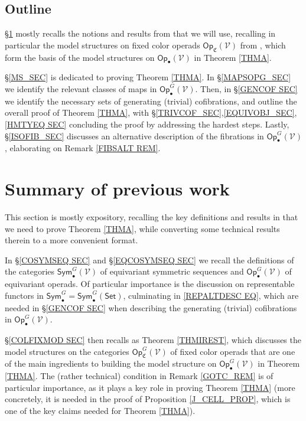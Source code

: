 \documentclass[a4paper,10pt
 ,final
]{article}%
\numberwithin{equation}{section}
\numberwithin{figure}{section}
\theoremstyle{definition} %
\newcommand{\V}{\ensuremath{\mathcal V}}
\newcommand{\1}{\ensuremath{\mathbbm 1}}%
\begin{document}
\subsection{Outline}


\S \ref{SUM SEC} mostly recalls the notions and results from
\cite{BP_FCOP} that we will use,
recalling in particular the model structures
on fixed color operads 
$\mathsf{Op}_{\mathfrak{C}}(\V)$ from
\cite[Thm. \ref{OC-THMI}]{BP_FCOP},
which form the basis of the model structures on
$\mathsf{Op}_{\bullet}(\V)$
in Theorem \ref{THMA}.


\S \ref{MS_SEC} is dedicated to proving 
Theorem \ref{THMA}.
In \S \ref{MAPSOPG_SEC} we identify the relevant classes of maps
in $\mathsf{Op}^G_{\bullet}(\V)$.
Then, in \S \ref{GENCOF SEC} we identify
the necessary sets of generating (trivial) cofibrations,
and outline the overall proof of Theorem \ref{THMA},
with \S \ref{TRIVCOF_SEC},\ref{EQUIVOBJ_SEC},\ref{HMTYEQ SEC}
concluding the proof by addressing the hardest steps.
Lastly, \S \ref{ISOFIB_SEC} discusses an alternative description
of the fibrations in
$\mathsf{Op}^G_{\bullet}(\V)$,
elaborating on 
Remark \ref{FIBSALT REM}.






\section{Summary of previous work}
\label{SUM SEC}


This section is mostly expository, 
recalling the key definitions and results 
in \cite{BP_FCOP} that we need to 
prove Theorem \ref{THMA},
while converting some technical results therein 
to a more convenient format.


In \S \ref{COSYMSEQ SEC} and \S \ref{EQCOSYMSEQ SEC} 
we recall the definitions
of the categories
$\mathsf{Sym}^G_{\bullet}(\V)$
of equivariant symmetric sequences and
$\mathsf{Op}^G_{\bullet}(\V)$
of equivariant operads.
Of particular importance is the discussion on 
representable functors in 
$\mathsf{Sym}^G_{\bullet}
=
\mathsf{Sym}^G_{\bullet}(\mathsf{Set})$,
culminating in \eqref{REPALTDESC EQ},
which are needed in \S \ref{GENCOF SEC}
when describing the generating (trivial) cofibrations
in $\mathsf{Op}^G_{\bullet}(\V)$.


\S \ref{COLFIXMOD SEC} then recalls
\cite[Thm. \ref{OC-THMI}]{BP_FCOP}
as Theorem \ref{THMIREST},
which discusses the model structures on the categories
$\mathsf{Op}^G_{\mathfrak{C}}(\V)$
of fixed color operads
that are one of the main ingredients to building 
the model structure on 
$\mathsf{Op}^G_{\bullet}(\V)$
in Theorem \ref{THMA}.
The (rather technical) condition in
Remark \ref{GOTC_REM} is of particular importance,
as it plays a key role in proving Theorem \ref{THMA}
(more concretely, it is needed in the
proof of Proposition \ref{J_CELL_PROP},
which is one of the key claims needed for Theorem \ref{THMA}).
\end{document}
